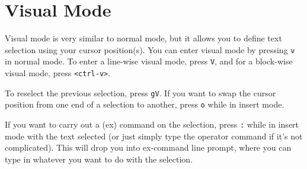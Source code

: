 \section{Visual Mode}

Visual mode is very similar to normal mode, but it allows you to define text selection using your cursor position(s).
You can enter visual mode by pressing \verb|v| in normal mode.
To enter a line-wise visual mode, press \verb|V|, and for a block-wise visual mode, press \verb|<ctrl-v>|.

To reselect the previous selection, press \verb|gV|.
If you want to swap the cursor position from one end of a selection to another, press \verb|o| while in insert mode.

If you want to carry out a (ex) command on the selection, press \verb|:| while in insert mode with the text selected (or just simply type the operator command if it's not complicated).
This will drop you into ex-command line prompt, where you can type in whatever you want to do with the selection.
